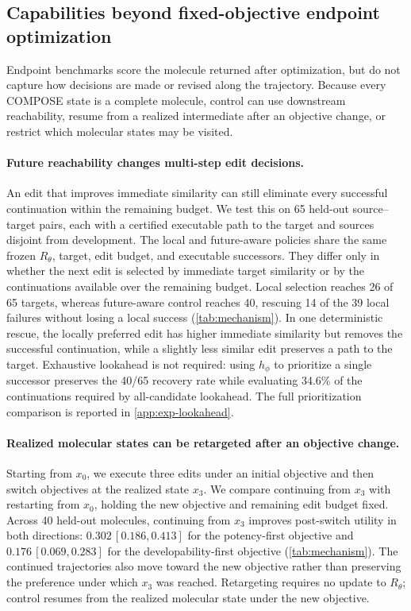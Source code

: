 \subsection{Capabilities beyond fixed-objective endpoint optimization}
\label{sec:gem-exp-capabilities}

Endpoint benchmarks score the molecule returned after optimization, but do not
capture how decisions are made or revised along the trajectory. Because every
COMPOSE state is a complete molecule, control can use downstream reachability,
resume from a realized intermediate after an objective change, or restrict which
molecular states may be visited.

\paragraph{Future reachability changes multi-step edit decisions.}
An edit that improves immediate similarity can still eliminate every successful
continuation within the remaining budget. We test this on 65 held-out
source--target pairs, each with a certified executable path to the target and
sources disjoint from development. The local and future-aware policies share the
same frozen $R_\theta$, target, edit budget, and executable successors. They
differ only in whether the next edit is selected by immediate target similarity
or by the continuations available over the remaining budget.
Local selection reaches 26 of 65 targets, whereas future-aware control reaches
40, rescuing 14 of the 39 local failures without losing a local success
(\cref{tab:mechanism}). In one deterministic rescue, the locally preferred edit
has higher immediate similarity but removes the successful continuation, while a
slightly less similar edit preserves a path to the target. Exhaustive lookahead
is not required: using $h_\phi$ to prioritize a single successor preserves the
40/65 recovery rate while evaluating 34.6\% of the continuations required by
all-candidate lookahead. The full prioritization comparison is reported in
\cref{app:exp-lookahead}.

\paragraph{Realized molecular states can be retargeted after an objective change.}
Starting from $x_0$, we execute three edits under an initial objective and then
switch objectives at the realized state $x_3$. We compare continuing from $x_3$
with restarting from $x_0$, holding the new objective and remaining edit budget
fixed.
Across 40 held-out molecules, continuing from $x_3$ improves post-switch utility
in both directions: $0.302\,[0.186,0.413]$ for the potency-first objective and
$0.176\,[0.069,0.283]$ for the developability-first objective
(\cref{tab:mechanism}). The continued trajectories also move toward the new
objective rather than preserving the preference under which $x_3$ was reached.
Retargeting requires no update to $R_\theta$; control resumes from the realized
molecular state under the new objective.

